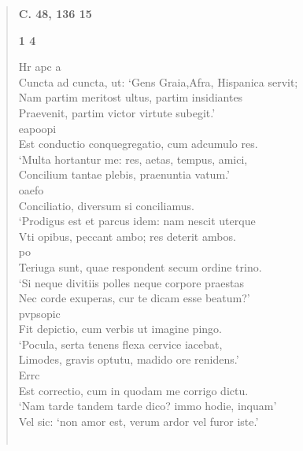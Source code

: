 \documentclass[11pt, a4paper]{report}
\begin{document}
\begin{verse}
    \begin{center} \textbf{C. 48, 136 15} \end{center}\begin{center} \textbf{1 4} \end{center}Hr apc a \\ Cuncta ad cuncta, ut: ‘Gens Graia,Afra, Hispanica servit; \\ Nam partim meritost ultus, partim insidiantes \\ Praevenit, partim victor virtute subegit.’ \\ eapoopi \\ Est conductio conquegregatio, cum adcumulo res. \\ ‘Multa hortantur me: res, aetas, tempus, amici, \\ Concilium tantae plebis, praenuntia vatum.’ \\ oaefo \\ Conciliatio, diversum si conciliamus. \\ ‘Prodigus  \lbrack est \rbrack  et parcus idem:  \lbrack nam \rbrack  nescit uterque \\ Vti opibus, peccant ambo; res deterit ambos. \\ po \\ Teriuga sunt, quae respondent secum ordine trino. \\ ‘Si neque divitiis polles neque corpore praestas \\ Nec corde exuperas, cur te dicam esse beatum?’ \\ pvpsopic \\ Fit depictio, cum verbis ut imagine pingo. \\ ‘Pocula, serta tenens flexa cervice iacebat, \\ Limodes, gravis optutu, madido ore renidens.’ \\ Errc \\ Est correctio, cum in quodam me corrigo dictu. \\ ‘Nam tarde tandem tarde dico? immo hodie, inquam’ \\ Vel sic: ‘non amor est, verum ardor vel furor iste.’ \\ 
        ﻿\pagebreak 

\end{verse}
\end{document}
